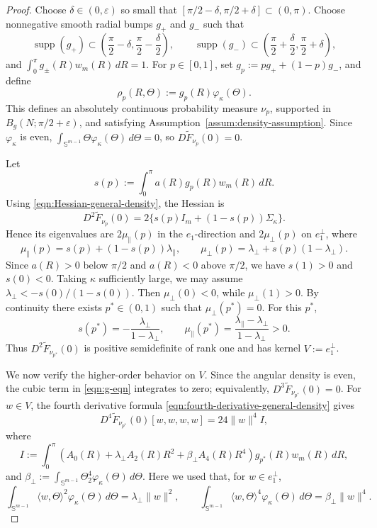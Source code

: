 \documentclass{amsart}
\theoremstyle{definition}
\theoremstyle{remark}
\newcommand\0{\boldsymbol{0}}
\begin{document}
\begin{proof}
Choose \(\delta\in(0,\varepsilon)\) so small that \([\pi/2-\delta,\pi/2+\delta]\subset(0,\pi)\). Choose nonnegative smooth radial bumps \(g_+\) and \(g_-\) such that
\[
\operatorname{supp}(g_+)\subset \left(\frac{\pi}{2}-\delta,\frac{\pi}{2}-\frac{\delta}{2}\right),
\qquad
\operatorname{supp}(g_-)\subset \left(\frac{\pi}{2}+\frac{\delta}{2},\frac{\pi}{2}+\delta\right),
\]
and \(\int_0^\pi g_\pm(R)w_m(R)\,dR=1\). For \(p\in[0,1]\), set \(g_p:=pg_++(1-p)g_-\), and define
\[
\rho_p(R,\Theta):=g_p(R)\varphi_\kappa(\Theta).
\]
This defines an absolutely continuous probability measure \(\nu_p\), supported in \(B_g(N;\pi/2+\varepsilon)\), and satisfying Assumption~\ref{assum:density-assumption}. Since \(\varphi_\kappa\) is even, \(\int_{\mathbb S^{m-1}}\Theta\varphi_\kappa(\Theta)\,d\Theta=0\), so \(D\widetilde F_{\nu_p}(0)=0\).

Let
\[
s(p):=\int_0^\pi a(R)g_p(R)w_m(R)\,dR.
\]
Using \eqref{eqn:Hessian-general-density}, the Hessian is
\[
D^2\widetilde F_{\nu_p}(0)=2\{s(p)I_m+(1-s(p))\Sigma_\kappa\}.
\]
Hence its eigenvalues are \(2\mu_\parallel(p)\) in the \(e_1\)-direction and \(2\mu_\perp(p)\) on \(e_1^\perp\), where
\[
\mu_\parallel(p)=s(p)+(1-s(p))\lambda_\parallel,
\qquad
\mu_\perp(p)=\lambda_\perp+s(p)(1-\lambda_\perp).
\]
Since \(a(R)>0\) below \(\pi/2\) and \(a(R)<0\) above \(\pi/2\), we have \(s(1)>0\) and \(s(0)<0\). Taking \(\kappa\) sufficiently large, we may assume \(\lambda_\perp<-s(0)/(1-s(0))\). Then \(\mu_\perp(0)<0\), while \(\mu_\perp(1)>0\). By continuity there exists \(p^\ast\in(0,1)\) such that \(\mu_\perp(p^\ast)=0\). For this \(p^\ast\),
\[
s(p^\ast)=-\frac{\lambda_\perp}{1-\lambda_\perp},
\qquad
\mu_\parallel(p^\ast)
=
\frac{\lambda_\parallel-\lambda_\perp}{1-\lambda_\perp}>0.
\]
Thus \(D^2\widetilde F_{\nu_{p^\ast}}(0)\) is positive semidefinite of rank one and has kernel \(V:=e_1^\perp\).

We now verify the higher-order behavior on \(V\). Since the angular density is even, the cubic term in \eqref{eqn:g-eqn} integrates to zero; equivalently, \(D^3\widetilde F_{\nu_{p^\ast}}(0)=0\). For \(w\in V\), the fourth derivative formula \eqref{eqn:fourth-derivative-general-density} gives
\[
D^4\widetilde F_{\nu_{p^\ast}}(0)[w,w,w,w]
=
24\|w\|^4 I,
\]
where
\[
I
:=
\int_0^\pi
\left(A_0(R)+\lambda_\perp A_2(R)R^2+\beta_\perp A_4(R)R^4\right)
g_{p^\ast}(R)w_m(R)\,dR,
\]
and \(\beta_\perp:=\int_{\mathbb S^{m-1}}\Theta_2^4\varphi_\kappa(\Theta)\,d\Theta\). Here we used that, for \(w\in e_1^\perp\),
\[
\int_{\mathbb S^{m-1}}\langle w,\Theta\rangle^2\varphi_\kappa(\Theta)\,d\Theta=\lambda_\perp\|w\|^2,
\qquad
\int_{\mathbb S^{m-1}}\langle w,\Theta\rangle^4\varphi_\kappa(\Theta)\,d\Theta=\beta_\perp\|w\|^4.
\]


\end{proof}
\end{document}
